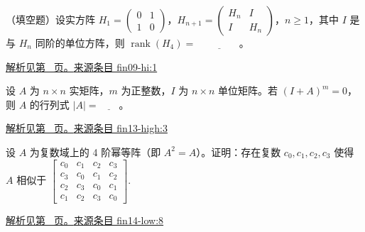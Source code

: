 \documentclass[12pt,fontset=fandol]{ctexart}
\begin{document}
\begin{example}\label{ex:fin09-hi:1}

（填空题）设实方阵 $H_{1}=\begin{pmatrix}0&1\\1&0\end{pmatrix}$，$H_{n+1}=\begin{pmatrix}H_{n}&I\\I&H_{n}\end{pmatrix}$，$n \geq 1$，其中 $I$ 是与 $H_{n}$ 同阶的单位方阵，则 $\operatorname{rank}(H_{4})=$ $\underline{\qquad\qquad}$。

\par\hyperref[ans:fin09-hi:1]{解析见第~\pageref{ans:fin09-hi:1} 页。}\quad\href{https://github.com/lzxcr/cmc-mathematics/blob/64916fa1fdbc3e444a652eca204d5669058ee321/src/problems/finals/09/01.md}{来源条目 fin09-hi:1}

\end{example}

\begin{example}\label{ex:fin13-high:3}

设 $A$ 为 $n \times n$ 实矩阵，$m$ 为正整数，$I$ 为 $n \times n$ 单位矩阵。若 $(I+A)^m = 0$，则 $A$ 的行列式 $|A| = \underline{\qquad}$。

\par\hyperref[ans:fin13-high:3]{解析见第~\pageref{ans:fin13-high:3} 页。}\quad\href{https://github.com/lzxcr/cmc-mathematics/blob/64916fa1fdbc3e444a652eca204d5669058ee321/src/problems/finals/13/03.md}{来源条目 fin13-high:3}

\end{example}

\begin{example}\label{ex:fin14-low:8}

设 $A$ 为复数域上的 4 阶幂等阵（即 $A^2 = A$）。证明：存在复数 $c_0, c_1, c_2, c_3$ 使得 $A$ 相似于 $\begin{bmatrix} c_0 & c_1 & c_2 & c_3 \\ c_3 & c_0 & c_1 & c_2 \\ c_2 & c_3 & c_0 & c_1 \\ c_1 & c_2 & c_3 & c_0 \end{bmatrix}.$

\par\hyperref[ans:fin14-low:8]{解析见第~\pageref{ans:fin14-low:8} 页。}\quad\href{https://github.com/lzxcr/cmc-mathematics/blob/64916fa1fdbc3e444a652eca204d5669058ee321/src/problems/finals/14/08.md}{来源条目 fin14-low:8}

\end{example}
\end{document}

